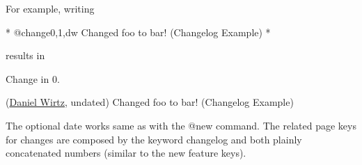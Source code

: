 For example, writing \begin{DoxyVerb}*  @change{0,1,dw} Changed foo to bar! (Changelog Example)
*  \end{DoxyVerb}
 results in \begin{DoxyRefDesc}{Change in 0.}
\item[\hyperlink{changelog0_1__changelog0_1000002}{Change in 0.\+1}](\hyperlink{developers_dw}{Daniel Wirtz}, undated) Changed foo to bar! (Changelog Example)\end{DoxyRefDesc}


The optional date works same as with the \textquotesingle{}@new\textquotesingle{} command. The related page keys for changes are composed by the keyword \textquotesingle{}changelog\textquotesingle{} and both plainly concatenated numbers (similar to the new feature keys). 